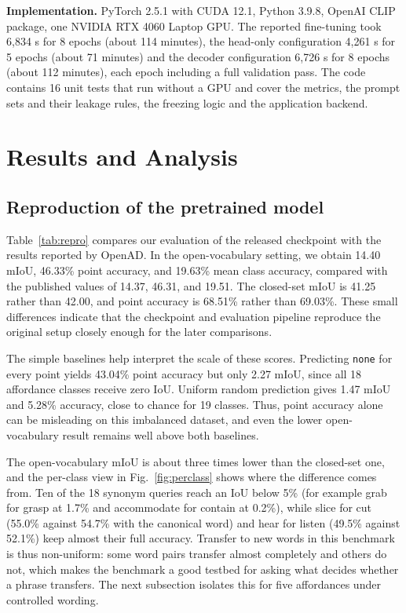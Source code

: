 \documentclass[conference]{IEEEtran}
\begin{document}
\textbf{Implementation.} PyTorch 2.5.1 with CUDA 12.1, Python 3.9.8, OpenAI CLIP package, one NVIDIA RTX 4060 Laptop GPU. The reported fine-tuning took 6,834 s for 8 epochs (about 114 minutes), the head-only configuration 4,261 s for 5 epochs (about 71 minutes) and the decoder configuration 6,726 s for 8 epochs (about 112 minutes), each epoch including a full validation pass. The code contains 16 unit tests that run without a GPU and cover the metrics, the prompt sets and their leakage rules, the freezing logic and the application backend.

\section{Results and Analysis}
\label{sec:results}

\subsection{Reproduction of the pretrained model}
\label{sec:repro}
Table~\ref{tab:repro} compares our evaluation of the released checkpoint with the results reported by OpenAD. In the open-vocabulary setting, we obtain 14.40 mIoU, 46.33\% point accuracy, and 19.63\% mean class accuracy, compared with the published values of 14.37, 46.31, and 19.51. The closed-set mIoU is 41.25 rather than 42.00, and point accuracy is 68.51\% rather than 69.03\%. These small differences indicate that the checkpoint and evaluation pipeline reproduce the original setup closely enough for the later comparisons.

The simple baselines help interpret the scale of these scores. Predicting \texttt{none} for every point yields 43.04\% point accuracy but only 2.27 mIoU, since all 18 affordance classes receive zero IoU. Uniform random prediction gives 1.47 mIoU and 5.28\% accuracy, close to chance for 19 classes. Thus, point accuracy alone can be misleading on this imbalanced dataset, and even the lower open-vocabulary result remains well above both baselines.

The open-vocabulary mIoU is about three times lower than the closed-set one, and the per-class view in Fig.~\ref{fig:perclass} shows where the difference comes from. Ten of the 18 synonym queries reach an IoU below 5\% (for example grab for grasp at 1.7\% and accommodate for contain at 0.2\%), while slice for cut (55.0\% against 54.7\% with the canonical word) and hear for listen (49.5\% against 52.1\%) keep almost their full accuracy. Transfer to new words in this benchmark is thus non-uniform: some word pairs transfer almost completely and others do not, which makes the benchmark a good testbed for asking what decides whether a phrase transfers. The next subsection isolates this for five affordances under controlled wording.
\end{document}
